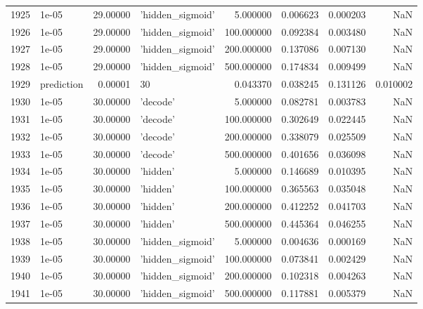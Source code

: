 \documentclass[10pt,a4paper]{article}
\begin{document}
\begin{tabular}{llrlrrrr}
1925 &       1e-05 &  29.00000 &   'hidden\_sigmoid' &    5.000000 &  0.006623 &  0.000203 &       NaN \\
1926 &       1e-05 &  29.00000 &   'hidden\_sigmoid' &  100.000000 &  0.092384 &  0.003480 &       NaN \\
1927 &       1e-05 &  29.00000 &   'hidden\_sigmoid' &  200.000000 &  0.137086 &  0.007130 &       NaN \\
1928 &       1e-05 &  29.00000 &   'hidden\_sigmoid' &  500.000000 &  0.174834 &  0.009499 &       NaN \\
1929 &  prediction &   0.00001 &                 30 &    0.043370 &  0.038245 &  0.131126 &  0.010002 \\
1930 &       1e-05 &  30.00000 &           'decode' &    5.000000 &  0.082781 &  0.003783 &       NaN \\
1931 &       1e-05 &  30.00000 &           'decode' &  100.000000 &  0.302649 &  0.022445 &       NaN \\
1932 &       1e-05 &  30.00000 &           'decode' &  200.000000 &  0.338079 &  0.025509 &       NaN \\
1933 &       1e-05 &  30.00000 &           'decode' &  500.000000 &  0.401656 &  0.036098 &       NaN \\
1934 &       1e-05 &  30.00000 &           'hidden' &    5.000000 &  0.146689 &  0.010395 &       NaN \\
1935 &       1e-05 &  30.00000 &           'hidden' &  100.000000 &  0.365563 &  0.035048 &       NaN \\
1936 &       1e-05 &  30.00000 &           'hidden' &  200.000000 &  0.412252 &  0.041703 &       NaN \\
1937 &       1e-05 &  30.00000 &           'hidden' &  500.000000 &  0.445364 &  0.046255 &       NaN \\
1938 &       1e-05 &  30.00000 &   'hidden\_sigmoid' &    5.000000 &  0.004636 &  0.000169 &       NaN \\
1939 &       1e-05 &  30.00000 &   'hidden\_sigmoid' &  100.000000 &  0.073841 &  0.002429 &       NaN \\
1940 &       1e-05 &  30.00000 &   'hidden\_sigmoid' &  200.000000 &  0.102318 &  0.004263 &       NaN \\
1941 &       1e-05 &  30.00000 &   'hidden\_sigmoid' &  500.000000 &  0.117881 &  0.005379 &       NaN \\
\bottomrule
\end{tabular}
\end{document}
